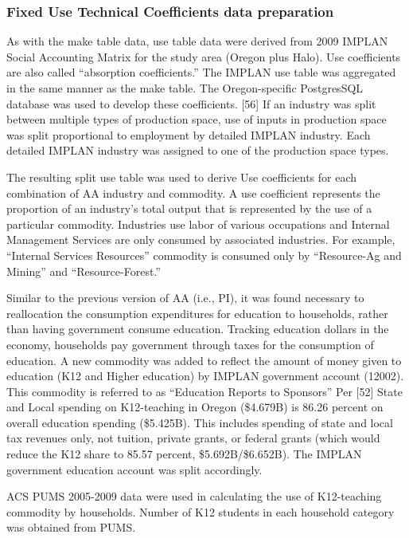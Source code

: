 \subsubsection{Fixed Use Technical Coefficients data preparation}
As with the make table data, use table data were derived from 2009 IMPLAN Social Accounting Matrix for the study area (Oregon plus Halo). Use coefficients are also called ``absorption coefficients.'' The IMPLAN use table was aggregated in the same manner as the make table. The Oregon-specific PostgresSQL database was used to develop these coefficients. [56] If an industry was split between multiple types of production space, use of inputs in production space was split proportional to employment by detailed IMPLAN industry. Each detailed IMPLAN industry was assigned to one of the production space types.

The resulting split use table was used to derive Use coefficients for each combination of AA industry and commodity. A use coefficient represents the proportion of an industry's total output that is represented by the use of a particular commodity. Industries use labor of various occupations and Internal Management Services are only consumed by associated industries. For example, ``Internal Services Resources'' commodity is consumed only by ``Resource-Ag and Mining'' and ``Resource-Forest.'' 

Similar to the previous version of AA (i.e., PI), it was found necessary to reallocation the consumption expenditures for education to households, rather than having government consume education. Tracking education dollars in the economy, households pay government through taxes for the consumption of education. A new commodity was added to reflect the amount of money given to education (K12 and Higher education) by IMPLAN government account (12002). This commodity is referred to as ``Education Reports to Sponsors'' Per [52] State and Local spending on K12-teaching in Oregon (\$4.679B) is 86.26 percent on overall education spending (\$5.425B). This includes spending of state and local tax revenues only, not tuition, private grants, or federal grants (which would reduce the K12 share to 85.57 percent, \$5.692B/\$6.652B). The IMPLAN government education account was split accordingly.

ACS PUMS 2005-2009 data were used in calculating the use of K12-teaching commodity by households. Number of K12 students in each household category was obtained from PUMS.


